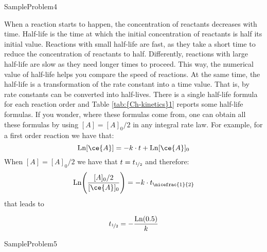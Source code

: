 \documentclass[main.tex]{subfiles}
\newcommand\chapterlabel{Ch-kinetics}
\begin{document}
\begin{description}
  {SampleProblem4}


\item[\docfilehook{Half-life, $t_{\nicefrac{1}{2}}$}{}] 
When a reaction starts to happen, the concentration of reactants decreases with time. Half-life is the time at which the initial concentration of reactants is half its initial value. Reactions with small half-life are fast, as they take a short time to reduce the concentration of reactants to half. Differently, reactions with large half-life are slow as they need longer times to proceed. This way, the numerical value of half-life helps you compare the speed of reactions. At the same time, the half-life is a transformation of the rate constant into a time value. That is, by rate constants can be converted into half-lives.
There is a single half-life formula for each reaction order and Table \ref{tab:{\chapterlabel}1} reports some half-life formulas. 
If you wonder, where these formulas come from, one can obtain all these formulas by using $[A]=[A]_0/2$ in any integral rate law. For example, for a first order reaction we have that:
\[\text{Ln}[\ce{A}]=-k\cdot t+\text{Ln}[\ce{A}]_0 \]
When $[A]=[A]_0/2$ we have that $t=t_{\nicefrac{1}{2}}$ and therefore:
\[\text{Ln}\Bigg(\frac{[A]_0/2}{[\ce{A}]_0}\Bigg)=-k\cdot t_{\nicefrac{1}{2}}\] that leads to

\[t_{\nicefrac{1}{2}}=-\frac{\text{Ln}(0.5)}{k} \]

\end{description}

  {SampleProblem5}
\end{document}
